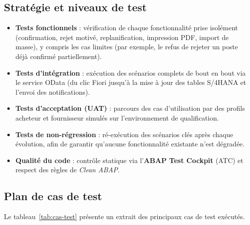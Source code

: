 \documentclass[12pt,a4paper,oneside]{report}
\begin{document}
\subsection{Stratégie et niveaux de test}\label{ch5:tests-strategie}
\begin{itemize}[label=---, itemsep=0.2em]
    \item \textbf{Tests fonctionnels} : vérification de chaque fonctionnalité prise
    isolément (confirmation, rejet motivé, replanification, impression PDF, import de
    masse), y compris les cas limites (par exemple, le refus de rejeter un poste déjà
    confirmé partiellement).
    \item \textbf{Tests d'intégration} : exécution des scénarios complets de bout en bout
    via le service OData (du clic Fiori jusqu'à la mise à jour des tables S/4HANA et
    l'envoi des notifications).
    \item \textbf{Tests d'acceptation (UAT)} : parcours des cas d'utilisation par des
    profils acheteur et fournisseur simulés sur l'environnement de qualification.
    \item \textbf{Tests de non-régression} : ré-exécution des scénarios clés après chaque
    évolution, afin de garantir qu'aucune fonctionnalité existante n'est dégradée.
    \item \textbf{Qualité du code} : contrôle statique via l'\textbf{ABAP Test Cockpit}
    (ATC) et respect des règles de \textit{Clean ABAP}.
\end{itemize}

\subsection{Plan de cas de test}\label{ch5:tests-cas}
Le tableau~\ref{tab:cas-test} présente un extrait des principaux cas de test exécutés.
\end{document}
